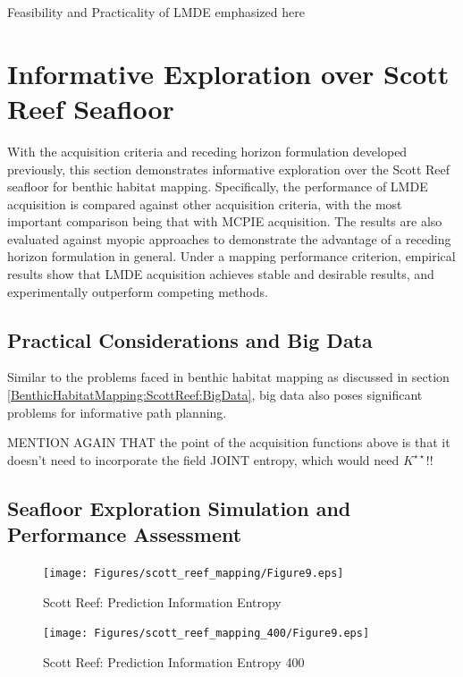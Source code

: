 			Feasibility and Practicality of LMDE emphasized here
		

	
	\section{Informative Exploration over Scott Reef Seafloor}
	\label{InformativeSeafloorExploration:ScottReef}
	
		With the acquisition criteria and receding horizon formulation developed previously, this section demonstrates informative exploration over the Scott Reef seafloor for benthic habitat mapping. Specifically, the performance of LMDE acquisition is compared against other acquisition criteria, with the most important comparison being that with MCPIE acquisition. The results are also evaluated against myopic approaches to demonstrate the advantage of a receding horizon formulation in general. Under a mapping performance criterion, empirical results show that LMDE acquisition achieves stable and desirable results, and experimentally outperform competing methods.
		
		\subsection{Practical Considerations and Big Data}
		\label{InformativeSeafloorExploration:ScottReef:BigData}
		
			Similar to the problems faced in benthic habitat mapping as discussed in section \ref{BenthicHabitatMapping:ScottReef:BigData}, big data also poses significant problems for informative path planning.
			
			
			MENTION AGAIN THAT the point of the acquisition functions above is that it doesn't need to incorporate the field JOINT entropy, which would need $K^{\star \star}$!!
			
		\subsection{Seafloor Exploration Simulation and Performance Assessment}
		
			\begin{figure}[bp]
			\centering
				\texttt{[image: Figures/scott\_reef\_mapping/Figure9.eps]}
			\caption{Scott Reef: Prediction Information Entropy}
			\label{Figure:ScottReefPredictionInformationEntropy}
			\end{figure}

			\begin{figure}[bp]
			\centering
				\texttt{[image: Figures/scott\_reef\_mapping\_400/Figure9.eps]}
			\caption{Scott Reef: Prediction Information Entropy 400}
			\label{Figure:ScottReefPredictionInformationEntropy400}
			\end{figure}
				
